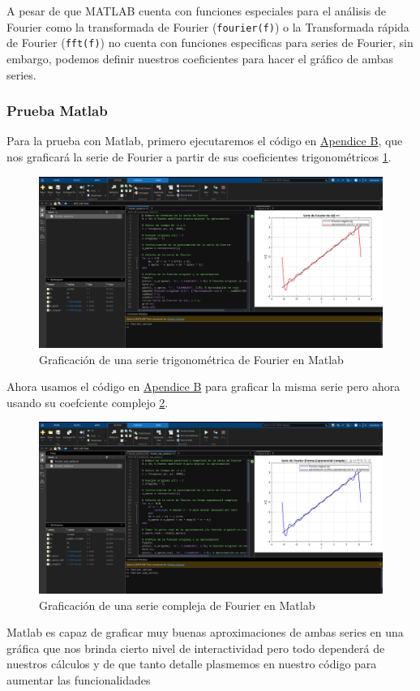 A pesar de que MATLAB cuenta con funciones especiales para el análisis de Fourier como la transformada de Fourier (\texttt{fourier(f)}) o la Transformada rápida de Fourier (\texttt{fft(f)}) no cuenta con funciones especificas para series de Fourier, sin embargo, podemos definir nuestros coeficientes para hacer el gráfico de ambas series.

\subsubsection{Prueba Matlab}
Para la prueba con Matlab, primero ejecutaremos el código en \hyperref[app2:trig-code-matlab]{Apendice B}, que nos graficará la serie de Fourier a partir de sus coeficientes trigonométricos \ref{fig:matlab-trig-series}. 
\begin{figure}[H]
	\centering
	\includegraphics[width=1\textwidth]{img/chapter02/matlab-fourier-trig.png}
	\caption{Graficación de una serie trigonométrica de Fourier en Matlab}
	\label{fig:matlab-trig-series}  %
\end{figure}
Ahora usamos el código en \hyperref[app2:complex-code-matlab]{Apendice B} para graficar la misma serie pero ahora usando su coefciente complejo \ref{fig:matlab-complex-series}.
\begin{figure}[H]
	\centering
	\includegraphics[width=1\textwidth]{img/chapter02/matlab-complex-series.png}
	\caption{Graficación de una serie compleja de Fourier en Matlab}
	\label{fig:matlab-complex-series}  %
\end{figure}
Matlab es capaz de graficar muy buenas aproximaciones de ambas series en una gráfica que nos brinda cierto nivel de interactividad pero todo dependerá de nuestros cálculos y de que tanto detalle plasmemos en nuestro código para aumentar las funcionalidades

